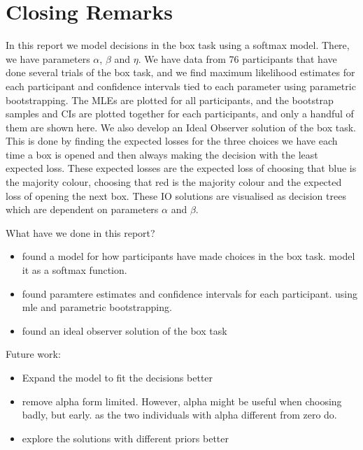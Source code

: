 \chapter{Closing Remarks}
In this report we model decisions in the box task using a softmax model. There, we have parameters $\alpha$, $\beta$ and $\eta$. We have data from 76 participants that have done several trials of the box task, and we find maximum likelihood estimates for each participant and confidence intervals tied to each parameter using parametric bootstrapping. The MLEs are plotted for all participants, and the bootstrap samples and CIs are plotted together for each participants, and only a handful of them are shown here. 
We also develop an Ideal Observer solution of the box task. This is done by finding the expected losses for the three choices we have each time a box is opened and then always making the decision with the least expected loss. These expected losses are the expected loss of choosing that blue is the majority colour, choosing that red is the majority colour and the expected loss of opening the next box. These IO solutions are visualised as decision trees which are dependent on parameters $\alpha$ and $\beta$.



What have we done in this report? 
\begin{itemize}
    \item found a model for how participants have made choices in the box task. model it as a softmax function. 
    \item found paramtere estimates and confidence intervals for each participant. using mle and parametric bootstrapping.
    \item found an ideal observer solution of the box task
\end{itemize}




Future work:
\begin{itemize}
    \item Expand the model to fit the decisions better
    \item remove alpha form limited. However, alpha might be useful when choosing badly, but early. as the two individuals with alpha different from zero do. 
    \item explore the solutions with different priors better
\end{itemize}
